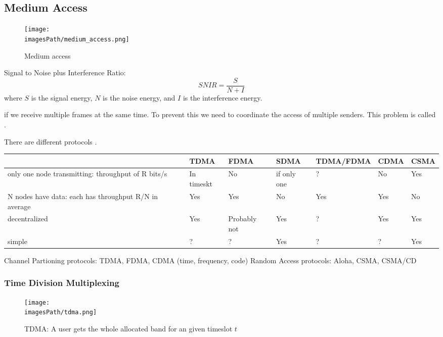 \subsection{Medium Access}
\begin{figure}[H]
    \centering
    \texttt{[image: \\imagesPath/medium\_access.png]}
    \caption{Medium access}
\end{figure}

Signal to Noise plus Interference Ratio:
\begin{equation}
    SNIR = \frac{S}{N+I}
\end{equation}
where $S$ is the signal energy, $N$ is the noise energy, and $I$ is the interference energy.

 if we receive multiple frames at the same time.
To prevent this we need to coordinate the access of multiple senders.
This problem is called .

There are different protocols .
\begin{center}
\begin{tabular}{ |m{4cm}|m{1.2cm}|m{1.5cm}|m{1cm}|m{2.5cm}|m{1cm}|m{1cm}| } 
     \hline
                                                           & TDMA       & FDMA         & SDMA        & TDMA/FDMA & CDMA & CSMA \\ 
     \hline
     only one node transmitting: throughput of R bits/s    & In timeskt & No           & if only one & ?         & No   & Yes  \\ 
     \hline
     N nodes have data: each has throughput R/N in average & Yes        & Yes          & No          & Yes       & Yes  & No   \\ 
     \hline
     decentralized                                         & Yes        & Probably not & Yes         & ?         & Yes  & Yes  \\
     \hline
     simple                                                & ?          & ?            & Yes         & ?         & ?    & Yes  \\
     \hline
\end{tabular}
\end{center}

Channel Partioning protocols: TDMA, FDMA, CDMA (time, frequency, code)
Random Access protocols: Aloha, CSMA, CSMA/CD

\subsubsection{Time Division Multiplexing}
\begin{figure}[H]
    \centering
    \texttt{[image: \\imagesPath/tdma.png]}
    \caption{TDMA: A user gets the whole allocated band for an given timeslot $t$}
\end{figure}

